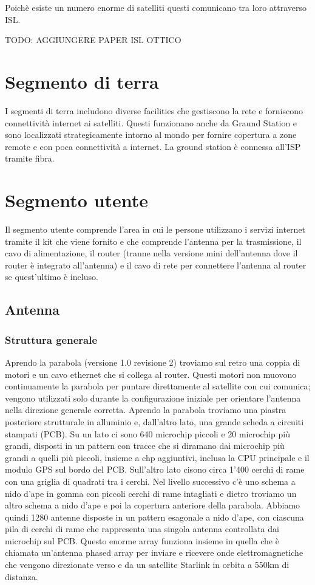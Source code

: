 Poichè esiste un numero enorme di satelliti questi comunicano tra loro attraverso \ac{ISL}.

TODO: AGGIUNGERE PAPER ISL OTTICO

\section{Segmento di terra}
I segmenti di terra includono diverse facilities che gestiscono la rete e forniscono connettività internet ai satelliti. Questi funzionano anche da Graund Station e sono localizzati strategicamente intorno al mondo per fornire copertura a zone remote e con poca connettività a internet.
La ground station è connessa all'\ac{ISP} tramite fibra.

\section{Segmento utente}
Il segmento utente comprende l'area in cui le persone utilizzano i servizi internet tramite il kit che viene fornito e che comprende l'antenna per la trasmissione, il cavo di alimentazione, il router (tranne nella versione mini dell'antenna dove il router è integrato all'antenna) e il cavo di rete per connettere l'antenna al router se quest'ultimo è incluso.

\subsection{Antenna}

\subsubsection{Struttura generale}
Aprendo la parabola (versione 1.0 revisione 2) troviamo sul retro una coppia di motori e un cavo ethernet che si collega al router.
Questi motori non muovono continuamente la parabola per puntare direttamente al satellite con cui comunica; vengono utilizzati solo durante la configurazione iniziale per orientare l'antenna nella direzione generale corretta.
Aprendo la parabola troviamo una piastra posteriore strutturale in alluminio e, dall'altro lato, una grande scheda a circuiti stampati (PCB).
Su un lato ci sono 640 microchip piccoli e 20 microchip più grandi, disposti in un pattern con tracce che si diramano dai microchip più grandi a quelli più piccoli, insieme a chp aggiuntivi, inclusa la CPU principale e il modulo GPS sul bordo del PCB. Sull'altro lato cisono circa 1'400 cerchi di rame con una griglia di quadrati tra i cerchi.
Nel livello successivo c'è uno schema a nido d'ape in gomma con piccoli cerchi di rame intagliati e dietro troviamo un altro schema a nido d'ape e poi la copertura anteriore della parabola.
Abbiamo quindi 1280 antenne disposte in un pattern esagonale a nido d'ape, con ciascuna pila di cerchi di rame che rappresenta una singola antenna controllata dai microchip sul PCB.
Questo enorme array funziona insieme in quella che è chiamata un'antenna phased array per inviare e ricevere onde elettromagnetiche che vengono direzionate verso e da un satellite Starlink in orbita a 550km di distanza.

